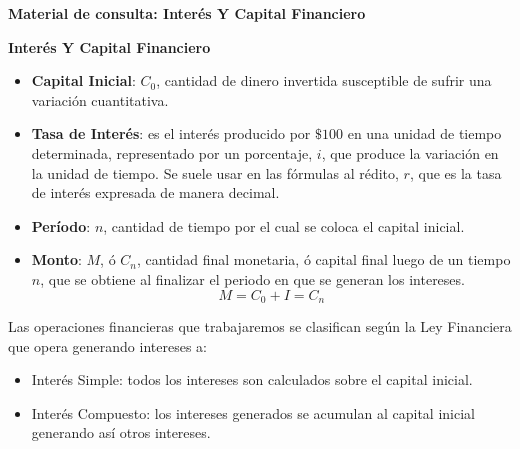 \documentclass[12pt]{examdesign}
\theoremstyle{plain}
\theoremstyle{definition}
\theoremstyle{remark}
\begin{document}
    \begin{endmatter}
    	
    	\centerline{\LARGE \textcolor{upforestgreen}{\textbf{Material de consulta: Interés Y Capital Financiero}}}
    	\vspace{.05cm}
    	\noindent \textbf{Interés Y Capital Financiero}
    	\vspace{.1cm}
    	
    	\begin{tcolorbox}[colback=red!10!white, colframe=tealgreen, title=\textbf{Los principales conceptos a trabajar serán son los siguientes:}]
    		\begin{itemize}
    			\item \textbf{Capital Inicial}: $C_{0}$, cantidad de dinero invertida susceptible de sufrir una variación cuantitativa.
    			\item \textbf{Tasa de Interés}: es el interés producido por $\$100$ en una unidad de tiempo determinada, representado por un porcentaje, $i$, que produce la variación en la unidad de tiempo. Se suele usar en las fórmulas al rédito, $r$, que es la tasa de interés expresada de manera decimal.
    			\item \textbf{Período}: $n$, cantidad de tiempo por el cual se coloca el capital inicial.
    			\item \textbf{Monto}: $M$, ó $C_{n}$, cantidad final monetaria, ó capital final luego de un tiempo $n$, que se obtiene al finalizar el periodo en que se generan los intereses.
    			\begin{equation}
    			    M = C_{0} + I = C_{n}
    			\end{equation}
    		\end{itemize}
    	\end{tcolorbox}
    	\vspace{.2cm}
    	
    	Las operaciones financieras que trabajaremos se clasifican según la Ley Financiera que opera generando intereses a:
    	
    	\begin{itemize}
    		\item Interés Simple: todos los intereses son calculados sobre el capital inicial.
    		\item Interés Compuesto: los intereses generados se acumulan al capital inicial generando así otros intereses.
    	\end{itemize}
    	

\end{endmatter}
\end{document}
